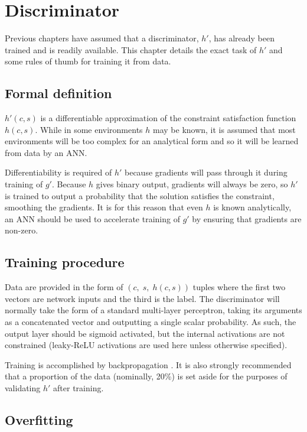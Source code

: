 \documentclass[../../main.tex]{subfiles}
\begin{document}
\chapter{Discriminator} \label{chapter:discriminator}

Previous chapters have assumed that a discriminator, $h'$, has already been trained and is readily available.
This chapter details the exact task of $h'$ and some rules of thumb for training it from data.

\section{Formal definition} \label{section:formalDefinition}

$h'(c,s)$ is a differentiable approximation of the constraint satisfaction function $h(c,s)$.
While in some environments $h$ may be known, it is assumed that most environments will be too complex for an analytical form and so it will be learned from data by an ANN.

Differentiability is required of $h'$ because gradients will pass through it during training of $g'$.
Because $h$ gives binary output, gradients will always be zero, so $h'$ is trained to output a probability that the solution satisfies the constraint, smoothing the gradients.
It is for this reason that even $h$ is known analytically, an ANN should be used to accelerate training of $g'$ by ensuring that gradients are non-zero.

\section{Training procedure} \label{section:discriminatorTrainingProcedure}

Data are provided in the form of $(c,\;s,\;h(c,s))$ tuples where the first two vectors are network inputs and the third is the label.
The discriminator will normally take the form of a standard multi-layer perceptron, taking its arguments as a concatenated vector and outputting a single scalar probability.
As such, the output layer should be sigmoid activated, but the internal activations are not constrained (leaky-ReLU activations are used here unless otherwise specified).

Training is accomplished by backpropagation \cite{rumelhart86}.
It is also strongly recommended that a proportion of the data (nominally, 20\%) is set aside for the purposes of validating $h'$ after training.

\section{Overfitting} \label{section:overfitting}
\end{document}
